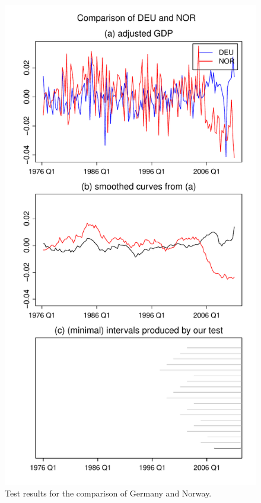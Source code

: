 \documentclass[a4paper,12pt]{article}
\begin{document}
{\begin{figure}[p!]
\begin{minipage}[t]{0.49\textwidth}
\includegraphics[width=\textwidth]{plots/DEU_vs_NOR}
\caption{Test results for the comparison of Germany and Norway.}\label{fig:Germany:Norway}
\end{minipage}
\hspace{0.25cm}

\end{figure}}
\end{document}

